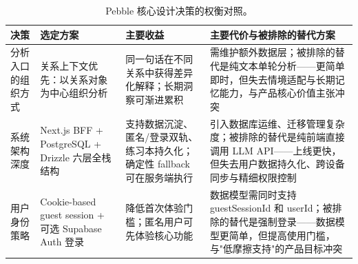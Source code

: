 \begin{table}[H]
  \centering
  \caption{Pebble 核心设计决策的权衡对照。}
  \label{tab:pebble-tradeoffs}
  \begin{tabularx}{\textwidth}{>{\raggedright\arraybackslash}p{2.2cm} >{\raggedright\arraybackslash}p{2.8cm} >{\raggedright\arraybackslash}X >{\raggedright\arraybackslash}X}
    \toprule
    决策 & 选定方案 & 主要收益 & 主要代价与被排除的替代方案 \\
    \midrule
    分析入口的组织方式 & 关系上下文优先：以关系对象为中心组织分析 & 同一句话在不同关系中获得差异化解释；长期洞察可渐进累积 & 需维护额外数据层；被排除的替代是纯文本单轮分析——更简单即时，但失去情境适配与长期记忆能力，与产品核心价值主张冲突 \\
    系统架构深度 & Next.js BFF + PostgreSQL + Drizzle 六层全栈结构 & 支持数据沉淀、匿名/登录双轨、练习本持久化；确定性 fallback 可在服务端执行 & 引入数据库运维、迁移管理复杂度；被排除的替代是纯前端直接调用 LLM API——上线更快，但失去用户数据持久化、跨设备同步与精细权限控制 \\
    用户身份策略 & Cookie-based guest session + 可选 Supabase Auth 登录 & 降低首次体验门槛；匿名用户可先体验核心功能 & 数据模型需同时支持 guestSessionId 和 userId；被排除的替代是强制登录——数据模型更简单，但提高使用门槛，与"低摩擦支持"的产品目标冲突 \\
    \bottomrule
  \end{tabularx}
\end{table}


